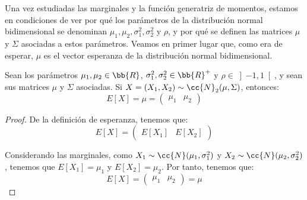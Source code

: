 Una vez estudiadas las marginales y la función generatriz de momentos, estamos en condiciones de ver por qué los parámetros de la distribución normal bidimensional se denominan $\mu_1, \mu_2, \sigma_1^2, \sigma_2^2$ y $\rho$, y por qué se definen las matrices $\mu$ y $\Sigma$ asociadas a estos parámetros. Veamos en primer lugar que, como era de esperar, $\mu$ es el vector esperanza de la distribución normal bidimensional.
\begin{prop}
    Sean los parámetros $\mu_1, \mu_2\in \bb{R}$, $\sigma_1^2, \sigma_2^2\in \bb{R}^+$ y $\rho\in \left]-1,1\right[$, y sean sus matrices $\mu$ y $\Sigma$ asociadas.
    Si $X=(X_1, X_2)\sim \cc{N}_2(\mu, \Sigma)$, entonces:
    \begin{equation*}
        E[X] = \mu = \begin{pmatrix}
            \mu_1 & \mu_2
        \end{pmatrix}
    \end{equation*}
\end{prop}
\begin{proof}
    De la definición de esperanza, tenemos que:
    \begin{equation*}
        E[X]=\begin{pmatrix}
            E[X_1] & E[X_2]
        \end{pmatrix}
    \end{equation*}

    Considerando las marginales, como $X_1\sim \cc{N}(\mu_1, \sigma_1^2)$ y $X_2\sim \cc{N}(\mu_2, \sigma_2^2)$, tenemos que $E[X_1]=\mu_1$ y $E[X_2]=\mu_2$. Por tanto, tenemos que:
    \begin{equation*}
        E[X]=\begin{pmatrix}
            \mu_1 & \mu_2
        \end{pmatrix}=\mu
    \end{equation*}
\end{proof}

